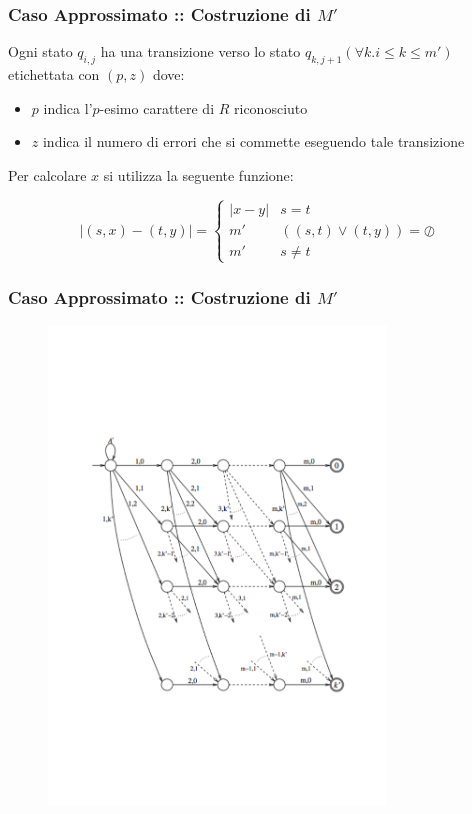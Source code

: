 \documentclass{beamer}
\begin{document}
\begin{frame}
\frametitle{Caso Approssimato :: Costruzione di $M'$}
Ogni stato $q_{i,j}$ ha una transizione verso lo stato $q_{k,j+1} (\forall k . i \leq k \leq m')$ etichettata con $(p,z)$ dove: 
\begin{itemize}
\item $p$ indica l'$p$-esimo carattere di $R$ riconosciuto
\item $z$ indica il numero di errori che si commette eseguendo tale transizione
\end{itemize}

Per calcolare $x$ si utilizza la seguente funzione:

\begin{equation*}
|(s,x) - (t,y)|= 
\begin{cases} 
|x-y| & \text{$s = t$}
\\
m'  &\text{$((s,t) \vee (t,y)) = \oslash$}
\\
m'  &\text{$s \not= t $}
\end{cases}
\end{equation*}


\end{frame}

\begin{frame}
\frametitle{Caso Approssimato :: Costruzione di $M'$}

\begin{figure}[p]
\vspace*{-3cm}
    \includegraphics[width=0.8\textwidth]{aprox_count.pdf}
\end{figure}

\end{frame}
\end{document}
